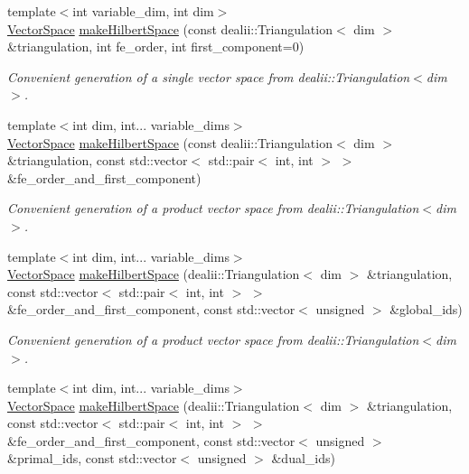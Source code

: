 \begin{DoxyCompactItemize}
\item 
{\footnotesize template$<$int variable\-\_\-dim, int dim$>$ }\\\hyperlink{classSpacy_1_1VectorSpace}{\-Vector\-Space} \hyperlink{namespaceSpacy_1_1dealII_a97a92becc85fac6fbf3598ef8ff1ca9c}{make\-Hilbert\-Space} (const dealii\-::\-Triangulation$<$ dim $>$ \&triangulation, int fe\-\_\-order, int first\-\_\-component=0)
\begin{DoxyCompactList}\small\item\em \-Convenient generation of a single vector space from dealii\-::\-Triangulation$<$dim$>$. \end{DoxyCompactList}\item 
{\footnotesize template$<$int dim, int... variable\-\_\-dims$>$ }\\\hyperlink{classSpacy_1_1VectorSpace}{\-Vector\-Space} \hyperlink{namespaceSpacy_1_1dealII_a554fe46c7a1b93af7dae16a6628e517a}{make\-Hilbert\-Space} (const dealii\-::\-Triangulation$<$ dim $>$ \&triangulation, const std\-::vector$<$ std\-::pair$<$ int, int $>$ $>$ \&fe\-\_\-order\-\_\-and\-\_\-first\-\_\-component)
\begin{DoxyCompactList}\small\item\em \-Convenient generation of a product vector space from dealii\-::\-Triangulation$<$dim$>$. \end{DoxyCompactList}\item 
{\footnotesize template$<$int dim, int... variable\-\_\-dims$>$ }\\\hyperlink{classSpacy_1_1VectorSpace}{\-Vector\-Space} \hyperlink{namespaceSpacy_1_1dealII_ab50ddf339c5fdf179bb932ba63b0d4c7}{make\-Hilbert\-Space} (dealii\-::\-Triangulation$<$ dim $>$ \&triangulation, const std\-::vector$<$ std\-::pair$<$ int, int $>$ $>$ \&fe\-\_\-order\-\_\-and\-\_\-first\-\_\-component, const std\-::vector$<$ unsigned $>$ \&global\-\_\-ids)
\begin{DoxyCompactList}\small\item\em \-Convenient generation of a product vector space from dealii\-::\-Triangulation$<$dim$>$. \end{DoxyCompactList}\item 
{\footnotesize template$<$int dim, int... variable\-\_\-dims$>$ }\\\hyperlink{classSpacy_1_1VectorSpace}{\-Vector\-Space} \hyperlink{namespaceSpacy_1_1dealII_aa87aa4cc2ea668da33e0a353e9af8cbc}{make\-Hilbert\-Space} (dealii\-::\-Triangulation$<$ dim $>$ \&triangulation, const std\-::vector$<$ std\-::pair$<$ int, int $>$ $>$ \&fe\-\_\-order\-\_\-and\-\_\-first\-\_\-component, const std\-::vector$<$ unsigned $>$ \&primal\-\_\-ids, const std\-::vector$<$ unsigned $>$ \&dual\-\_\-ids)

\end{DoxyCompactItemize}

